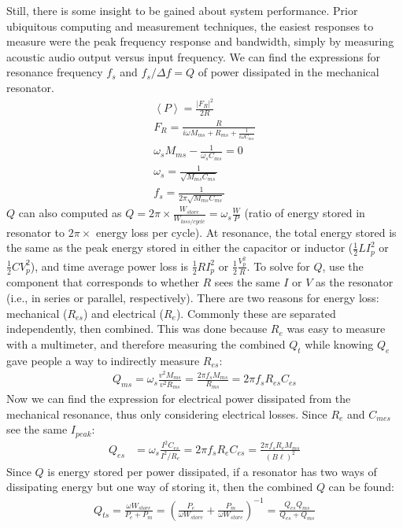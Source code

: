 \documentclass[10pt]{book}
\begin{document}
Still, there is some insight to be gained about system performance. Prior ubiquitous computing and measurement techniques, the easiest responses to measure were the peak frequency response and bandwidth, simply by measuring acoustic audio output versus input frequency.  We can find the expressions for resonance frequency $f_s$ and $f_s/\Delta f = Q$ of power dissipated in the mechanical resonator.
\begin{align}
\left\langle P\right\rangle=\frac{\left|F_R \right|^2}{2R}\\
F_R=\frac{R}{i\omega M_{ms}+R_{ms}+\frac{1}{i\omega C_{ms}}}\\
\omega_s M_{ms}-\frac{1}{\omega_s C_{ms}}=0\\
\omega_s=\frac{1}{\sqrt{M_{ms}C_{ms}}}\\
f_s=\frac{1}{2\pi\sqrt{M_{ms}C_{ms}}}
\end{align}
$Q$ can also computed as $Q=2\pi\times\frac{W_{store}}{W_{loss/cycle}}=\omega_s\frac{W}{P}$ (ratio of energy stored in resonator to $2\pi\times$ energy loss per cycle). At resonance, the total energy stored is the same as the peak energy stored in either the capacitor or inductor ($\frac{1}{2}LI_p^2$ or $\frac{1}{2}CV_p^2$), and time average power loss is $\frac{1}{2}RI_p^2$ or $\frac{1}{2}\frac{V_p^2}{R}$. To solve for $Q$, use the component that corresponds to whether $R$ sees the same $I$ or $V$ as the resonator (i.e., in series or parallel, respectively). There are two reasons for energy loss: mechanical ($R_{es}$) and electrical ($R_{e}$). Commonly these are separated independently, then combined. This was done because $R_e$ was easy to measure with a multimeter, and therefore measuring the combined $Q_t$ while knowing $Q_e$ gave people a way to indirectly measure $R_{es}$:
\begin{align}
Q_{ms}=\omega_s\frac{v^2M_{ms}}{v^2R_{ms}}=\frac{2\pi f_s M_{ms}}{R_{ms}}=2\pi f_s R_{es}C_{es}
\end{align}
Now we can find the expression for electrical power dissipated from the mechanical resonance, thus only considering electrical losses. Since $R_e$ and $C_{mes}$ see the same $I_{peak}$: 
\begin{align}
Q_{es}&=\omega_s\frac{I^2 C_{es}}{I^2/R_e}=2\pi f_s R_{e} C_{es}=\frac{2\pi f_s R_{e} M_{ms}}{(B\ell)^2}
\end{align}
Since $Q$ is energy stored per power dissipated, if a resonator has two ways of dissipating energy but one way of storing it, then the combined $Q$ can be found:
\begin{align}
Q_{ts}=\frac{\omega W_{store}}{P_e+P_m}=\left(\frac{P_e}{\omega W_{store}}+\frac{P_m}{\omega W_{store}}\right)^{-1}=\frac{Q_{es}Q_{ms}}{Q_{es}+Q_{ms}}\label{eq:Qts}
\end{align}
\end{document}
